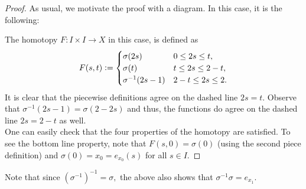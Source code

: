 \documentclass[12pt]{article}
\theoremstyle{definition}
\numberwithin{thm}{section}
\begin{document}
\begin{proof} 
	As usual, we motivate the proof with a diagram. In this case, it is the following:
	\begin{center}
	\end{center}
	The homotopy $F:I \times I \to X$ in this case, is defined as
	\begin{equation*} 
		F(s, t) \vcentcolon= \begin{cases}
			\sigma(2s) & 0 \le 2s \le t,\\
			\sigma(t) & t \le 2s \le 2 - t,\\
			\sigma^{-1}(2s - 1) & 2 - t \le 2s \le 2.
		\end{cases}
	\end{equation*}
	It is clear that the piecewise definitions agree on the dashed line $2s = t.$ Observe that $\sigma^{-1}(2s - 1) = \sigma(2 - 2s)$ and thus, the functions do agree on the dashed line $2s = 2 - t$ as well. \\
	One can easily check that the four properties of the homotopy are satisfied. To see the bottom line property, note that $F(s, 0) = \sigma(0)$ (using the second piece definition) and $\sigma(0) = x_0 = e_{x_0}(s)$ for all $s \in I.$
\end{proof}

Note that since $(\sigma^{-1})^{-1} = \sigma,$ the above also shows that $\sigma^{-1}\sigma = e_{x_1}.$
\end{document}
